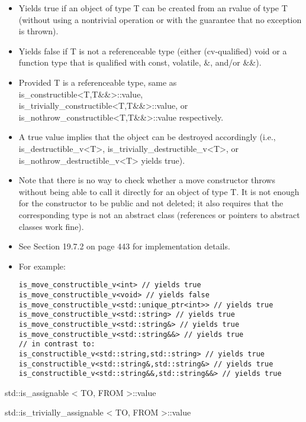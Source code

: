 \begin{itemize}
\item 
Yields true if an object of type T can be created from an rvalue of type T (without using a nontrivial operation or with the guarantee that no exception is thrown).

\item 
Yields false if T is not a referenceable type (either (cv-qualified) void or a function type that is qualified with const, volatile, \&, and/or \&\&).

\item 
Provided T is a referenceable type, same as is\_constructible<T,T\&\&>::value, is\_trivially\_constructible<T,T\&\&>::value, or is\_nothrow\_constructible<T,T\&\&>::value respectively.

\item 
A true value implies that the object can be destroyed accordingly (i.e., is\_destructible\_v<T>, is\_trivially\_destructible\_v<T>, or is\_nothrow\_destructible\_v<T> yields true).

\item 
Note that there is no way to check whether a move constructor throws without being able to call it directly for an object of type T. It is not enough for the constructor to be public and not deleted; it also requires that the corresponding type is not an abstract class (references or pointers to abstract classes work fine).

\item 
See Section 19.7.2 on page 443 for implementation details.

\item 
For example:
\begin{lstlisting}[style=styleCXX]
is_move_constructible_v<int> // yields true
is_move_constructible_v<void> // yields false
is_move_constructible_v<std::unique_ptr<int>> // yields true
is_move_constructible_v<std::string> // yields true
is_move_constructible_v<std::string&> // yields true
is_move_constructible_v<std::string&&> // yields true
// in contrast to:
is_constructible_v<std::string,std::string> // yields true
is_constructible_v<std::string&,std::string&> // yields true
is_constructible_v<std::string&&,std::string&&> // yields true
\end{lstlisting}
\end{itemize}

std::is\_assignable < TO, FROM >::value

std::is\_trivially\_assignable < TO, FROM >::value

